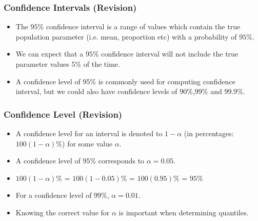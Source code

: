 {{%












\subsubsection{Confidence Intervals (Revision) }

\begin{itemize}
\item The $95\%$ confidence interval is a range of values which contain the true population parameter (i.e. mean, proportion etc) with a probability of $95\%$.
\item We can expect that a $95\%$ confidence interval will not include the true parameter values $5\%$ of the time.
\item A confidence level of $95\%$ is commonly used for computing confidence interval, but we could also have confidence levels of $90\%$,$99\%$ and $99.9\%$.
\end{itemize}






\subsubsection{Confidence Level (Revision) }

\begin{itemize}
\item A confidence level for an interval is denoted to $1-\alpha$ (in percentages: $100(1-\alpha)\%$) for some value $\alpha$.
\item A confidence level of $95\%$ corresponds to $\alpha = 0.05$.
\item $100(1-\alpha)\%$ = $100(1-0.05)\%$  = $100(0.95)\%$ = $95\%$
\item For a confidence level of $99\%$, $\alpha = 0.01$.
\item Knowing the correct value for $\alpha$ is important when determining quantiles.
\end{itemize}








}}

